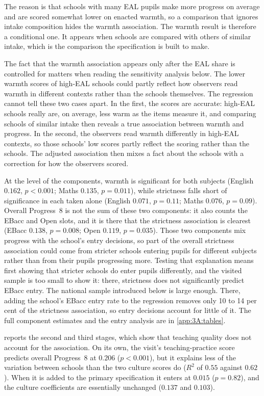 The reason is that schools with many EAL pupils make more progress on average
and are scored somewhat lower on enacted warmth, so a comparison that
ignores intake composition hides the warmth association. The warmth result
is therefore a conditional one. It appears when schools are compared with
others of similar intake, which is the comparison the specification is built to make.

The fact that the warmth association appears only after the EAL share is controlled for matters when reading the sensitivity analysis below. The lower warmth
scores of high-EAL schools could partly reflect how observers read warmth
in different contexts rather than the schools themselves. The regression cannot tell these two cases apart. In the first, the scores are accurate: high-EAL schools really are, on average, less warm as the items measure it, and comparing schools of similar intake then reveals a true association between warmth and progress. In the second, the observers read warmth differently in high-EAL contexts, so those schools' low scores partly reflect the scoring rather than the schools. The adjusted association then mixes a fact about the schools with a correction for how the observers scored.

At the level of the components, warmth is significant for both subjects
(English $0.162$, $p < 0.001$; Maths $0.135$, $p = 0.011$), while
strictness falls short of significance in each taken alone (English
$0.071$, $p = 0.11$; Maths $0.076$, $p = 0.09$). Overall Progress~8 is not
the sum of these two components: it also counts the EBacc and Open slots,
and it is there that the strictness association is clearest (EBacc $0.138$,
$p = 0.008$; Open $0.119$, $p = 0.035$). Those two components mix progress with the school's entry decisions, so part of the overall strictness association could come from stricter schools entering pupils for different subjects rather than from their pupils progressing more. Testing that explanation means first showing that stricter schools do enter pupils differently, and the visited sample is too small to show it: there, strictness does not significantly predict EBacc entry. The national sample introduced below is large enough. There, adding the school's EBacc entry rate to the regression removes only 10 to 14 per cent of the strictness association, so entry decisions account for little of it. The full component
estimates and the entry analysis are in \cref{app:3A:tables}.

 reports the second and third stages, which show that teaching quality does not account for the association. On its own, the visit's
teaching-practice score predicts overall Progress~8 at $0.206$ ($p < 0.001$), but it explains less of the variation between schools than the two culture scores do ($R^2$ of $0.55$ against $0.62$). When it
is added to the primary specification it enters at $0.015$ ($p = 0.82$), and
the culture coefficients are essentially unchanged ($0.137$ and $0.103$).

